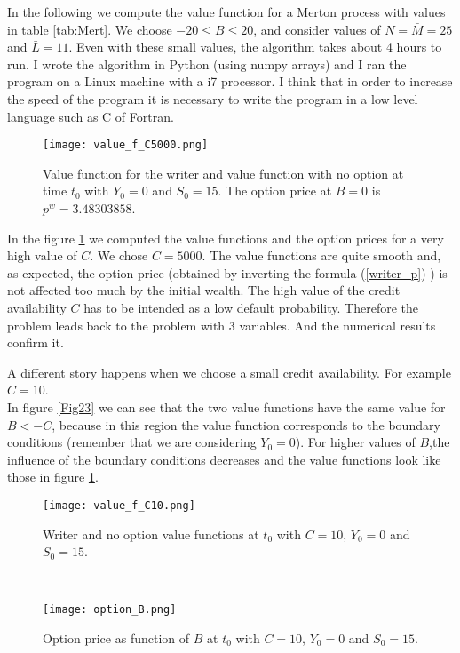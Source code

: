 In the following we compute the value function for a Merton process with values in table \ref{tab:Mert}. 
We choose $-20 \leq B \leq 20$, and consider values of $N = \bar M = 25$ and $\bar L = 11$. 
Even with these small values, the algorithm takes about 4 hours to run. 
I wrote the algorithm in Python (using numpy arrays) and I ran the program on a Linux machine with a i7 processor. I think that in order to increase the speed of the program
it is necessary to write the program in a low level language such as C of Fortran.
\begin{figure}[t!]
   \centering
   \texttt{[image: value\_f\_C5000.png]}
   \caption{Value function for the writer and value function with no option at time $t_0$ with $Y_0=0$ and $S_0=15$. The option price at $B=0$ is $p^w=3.48303858$.}
   \label{Fig22} 
\end{figure}

In the figure \ref{Fig22} we computed the value functions and the option prices for a very high value of $C$. We chose $C= 5000$.
The value functions are quite smooth and, as expected, the option price (obtained by inverting the formula (\ref{writer_p}) ) is not affected too much by the initial wealth. 
The high value of the credit availability $C$ 
has to be intended as a low default probability. Therefore the problem leads back to the problem with 3 variables. And the numerical results confirm it.

A different story happens when we choose a small credit availability. For example $C = 10$.\\ 
In figure \ref{Fig23} we can see that the two value functions have the same value for $B<-C$, because in this region the value function corresponds to the boundary conditions
(remember that we are considering $Y_0=0$). 
For higher values of $B$,the influence of the boundary conditions decreases and the value functions look like those in figure \ref{Fig22}.
\begin{figure}[t!]
 \begin{minipage}[b]{0.5\linewidth}
   \centering
   \texttt{[image: value\_f\_C10.png]}
   \caption{Writer and no option value functions at $t_0$ with $C=10$, $Y_0=0$ and $S_0=15$.}
   \label{Fig23} 
 \end{minipage}
 \ \hspace{2mm} \hspace{3mm} \
 \begin{minipage}[b]{0.5\linewidth}
   \texttt{[image: option\_B.png]}
   \caption{Option price as function of $B$ at $t_0$ with $C=10$, $Y_0=0$ and $S_0=15$.}
   \label{Fig24}
 \end{minipage}
\end{figure}  

